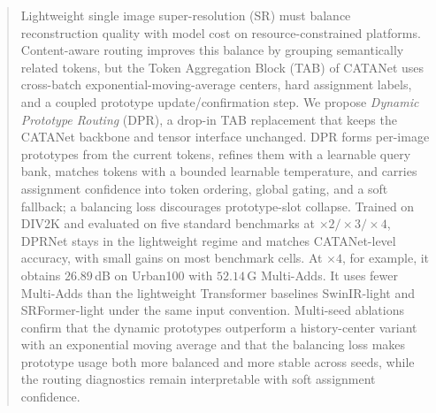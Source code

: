 \begin{abstract}
Lightweight single image super-resolution (SR) must balance reconstruction quality with
model cost on resource-constrained platforms. Content-aware routing improves this balance
by grouping semantically related tokens, but the Token Aggregation Block (TAB) of CATANet
uses cross-batch exponential-moving-average centers, hard assignment labels, and a coupled
prototype update/confirmation step. We propose \emph{Dynamic Prototype Routing} (DPR), a
drop-in TAB replacement that keeps the CATANet backbone and tensor interface unchanged.
DPR forms per-image prototypes from the current tokens, refines them with a learnable
query bank, matches tokens with a bounded learnable temperature, and carries assignment
confidence into token ordering, global gating, and a soft fallback; a balancing loss
discourages prototype-slot collapse. Trained on DIV2K and evaluated on five standard
benchmarks at $\times2/\times3/\times4$, DPRNet stays in the lightweight regime and
matches CATANet-level accuracy, with small gains on most benchmark cells. At $\times4$,
for example, it obtains $26.89$\,dB on Urban100 with $52.14$\,G Multi-Adds. It uses fewer
Multi-Adds than the lightweight Transformer baselines SwinIR-light and SRFormer-light
under the same input convention. Multi-seed ablations confirm that the
dynamic prototypes outperform a history-center variant with an exponential moving average
and that the balancing loss makes prototype usage both more balanced and more stable across
seeds, while the routing diagnostics remain interpretable with soft assignment confidence.
\end{abstract}
